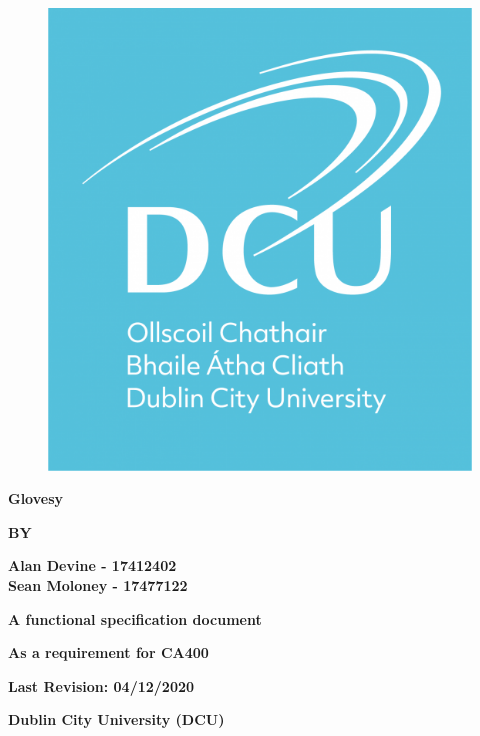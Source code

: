 \documentclass[12pt,a4paper,oneside]{book}
\theoremstyle{plain}
\numberwithin{equation}{chapter}
\begin{document}
\thispagestyle{empty}

\begin{figure}[h!]
\vskip1in
\begin{center}
\includegraphics[width = 3.5 cm]{res/DCU_logo_square.png}
\end{center}
\end{figure}

\begin{center}
\large\textbf{Glovesy}
\end{center}

\vskip2.5cm

\begin{center}
\textbf{BY}
\end{center}

\vskip0.6cm

\begin{center}
\textbf{Alan Devine - 17412402}\\
\textbf{Sean Moloney - 17477122}
\end{center}

\vskip3cm

\begin{center}
\textbf{A functional specification document}
\end{center}

\begin{center}
\textbf{As a requirement for CA400}
\end{center}
\vskip2cm

\begin{center}
\textbf{Last Revision: 04/12/2020}
\end{center}

\begin{center}
\textbf{Dublin City University (DCU)}
\end{center}
\end{document}
